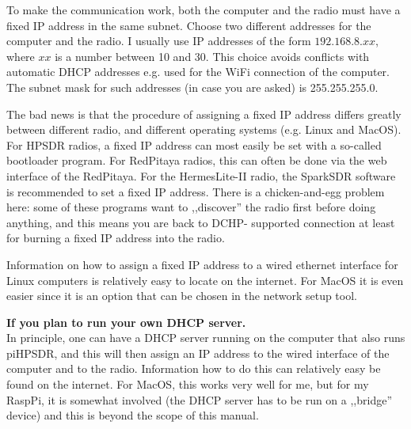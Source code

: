 \documentclass[12pt]{book}
\def\pH{pi\-HPSDR\xspace}
\begin{document}
To make the communication work, both the computer and the radio must have a fixed IP address
in the same subnet. Choose two different addresses for the computer and the radio.
I usually use IP addresses of the
form $192.168.8.xx$, where $xx$ is a number between 10 and 30. This choice avoids
conflicts with automatic DHCP addresses e.g. used for the WiFi connection of the computer.
The subnet mask for such addresses (in case you are asked) is 255.255.255.0.

The bad news is that the procedure of assigning a fixed IP address differs greatly between different
radio, and different operating systems (e.g. Linux and MacOS). For HPSDR radios, a fixed IP address
can most easily be set with a so-called bootloader program. For RedPitaya radios, this can often
be done via the web interface of the RedPitaya. For the HermesLite-II radio, the SparkSDR software
is recommended to set a fixed IP address. There is a chicken-and-egg problem here: some of these
programs
want to ,,discover'' the radio first before doing anything, and this means you are back to DCHP-
supported connection at least for burning a fixed IP address into the radio.

Information on how to assign a fixed IP address to a wired ethernet interface for Linux computers
is relatively easy to locate on the internet. For MacOS it is even easier since it is an option that
can be chosen in the network setup tool.


\textbf{If you plan to run your own DHCP server.}\\
In principle, one can have a DHCP server running on the computer that also runs \pH, and this
will then assign an IP address to the wired interface of the computer and to the
radio. Information how to do this can relatively easy be found on the internet. For MacOS, this
works very well for me, but for my RaspPi, it is somewhat involved (the DHCP server has to be run
on a ,,bridge'' device) and this is beyond the scope of this manual.


\begin{center}
\fbox{
\parbox{\textwidth - 4cm}{
\begin{center}
\textbf{\color{red} ----- End of the \pH manual -----}
\end{center}
}
}
\end{center}
\end{document}
